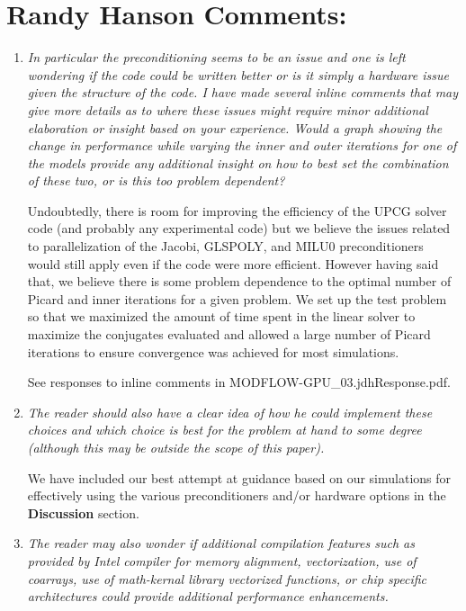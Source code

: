 \documentclass[12pt]{article} %
\begin{document}
\section*{\small{Randy Hanson Comments:}}
\begin{enumerate}
\item \textit{In particular the preconditioning seems to be an issue and one is left wondering if the code could be written better or is it simply a hardware issue given the structure of the code. I have made several inline comments that may give more details as to where these issues might require minor additional elaboration or insight based on your experience. Would a graph showing the change in performance while varying the inner and outer iterations for one of the models provide any additional insight on how to best set the combination of these two, or is this too problem dependent?} 

Undoubtedly, there is room for improving the efficiency of the UPCG solver code (and probably any experimental code) but we believe the issues related to parallelization of the Jacobi, GLSPOLY, and MILU0 preconditioners would still apply even if the code were more efficient. However having said that, we believe there is some problem dependence to the optimal number of Picard and inner iterations for a given problem. We set up the test problem so that we maximized the amount of time spent in the linear solver to maximize the conjugates evaluated and allowed a large number of Picard iterations to ensure convergence was achieved for most simulations.

See responses to inline comments in MODFLOW-GPU\_03.jdhResponse.pdf.

\item \textit{The reader should also have a clear idea of how he could implement these choices and which choice is best for the problem at hand to some degree (although this may be outside the scope of this paper).} 

We have included our best attempt at guidance based on our simulations for effectively using the various preconditioners and/or hardware options in the \textbf{Discussion} section. 

\item \textit{The reader may also wonder if additional compilation features such as provided by Intel compiler for memory alignment, vectorization, use of coarrays, use of math-kernal library vectorized functions, or chip specific architectures could provide additional performance enhancements.} 


\end{enumerate}
\end{document}
